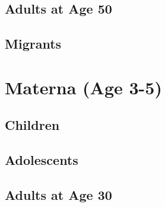 \documentclass[12pt]{article}
\begin{document}
\subsection{Adults at Age 50}







\subsection{Migrants}









\section{Materna (Age 3-5)}
\subsection{Children}







\subsection{Adolescents}







\subsection{Adults at Age 30}






\end{document}
